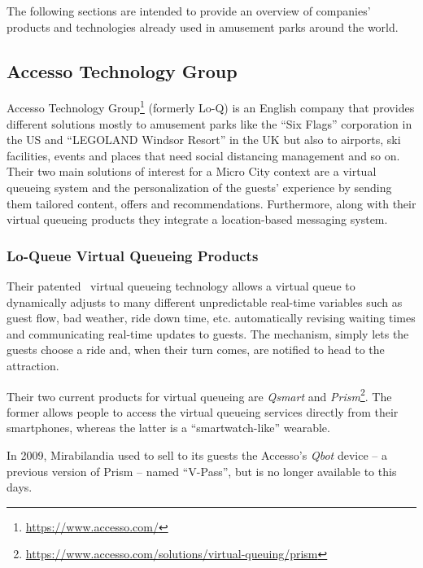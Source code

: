 The following sections are intended to provide an overview of companies' products and technologies already used in amusement parks around the world.

\subsection{Accesso Technology Group}\label{subsec:accesso-technology-group}
Accesso Technology Group\footnote{\url{https://www.accesso.com/}} (formerly Lo-Q) is an English company that provides different solutions
mostly to amusement parks like the ``Six Flags'' corporation in the US and ``LEGOLAND Windsor Resort'' in the UK but also to airports,
ski facilities, events and places that need social distancing management and so on.
Their two main solutions of interest for a Micro City context are a virtual queueing system and the personalization of
the guests' experience by sending them tailored content, offers and recommendations.
Furthermore, along with their virtual queueing products they integrate a location-based messaging system.

\subsubsection{Lo-Queue Virtual Queueing Products}
Their patented~\cite{q-management-system-patent} \cite{q-system-patent}
virtual queueing technology allows a virtual queue to dynamically adjusts to many different unpredictable real-time variables such
as guest flow, bad weather, ride down time, etc.
automatically revising waiting times and communicating real-time updates to guests.
The mechanism, simply lets the guests choose a ride and, when their turn comes, are notified to head to the attraction.

Their two current products for virtual queueing are \textit{Qsmart} and \textit{Prism}\footnote{\url{https://www.accesso.com/solutions/virtual-queuing/prism}}.
The former allows people to access the virtual queueing services directly from their smartphones, whereas the latter is a ``smartwatch-like''
wearable.

In 2009, Mirabilandia used to sell to its guests the Accesso's \textit{Qbot} device -- a previous version of Prism -- named ``V-Pass''\cite{v-pass-mira}, but is no
longer available to this days.

